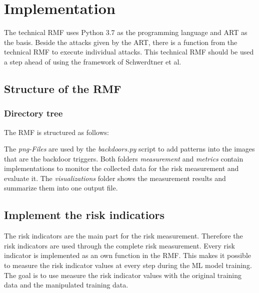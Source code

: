 \section{Implementation}
\label{sec:implementation}

The technical RMF uses Python 3.7 as the programming language and ART as the basis. Beside the attacks given by the ART, there is a function from the technical RMF to execute individual attacks. This technical RMF should be used a step ahead of using the framework of Schwerdtner et al.

\subsection{Structure of the RMF}

\subsubsection*{Directory tree}

The RMF is structured as follows: \\


\break \noindent The \textit{png-Files} are used by the \textit{backdoors.py} script to add patterns into the images that are the backdoor triggers. Both folders \textit{measurement} and \textit{metrics} contain implementations to monitor the collected data for the risk measurement and evaluate it. The \textit{visualizations} folder shows the measurement results and summarize them into one output file.

\subsection{Implement the risk indicatiors}

The risk indicators are the main part for the risk measurement. Therefore the risk indicators are used through the complete risk measurement. Every risk indicator is implemented as an own function in the RMF. This makes it possible to measure the risk indicator values at every step during the ML model training. The goal is to use measure the risk indicator values with the original training data and the manipulated training data.

